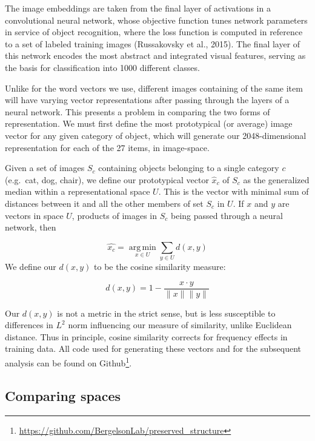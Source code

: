 \documentclass[10pt, letterpaper]{article}
\begin{document}
The image embeddings are taken from the final layer of activations in a
convolutional neural network, whose objective function tunes network
parameters in service of object recognition, where the loss function is
computed in reference to a set of labeled training images (Russakovsky
et al., 2015). The final layer of this network encodes the most abstract
and integrated visual features, serving as the basis for classification
into 1000 different classes.

Unlike for the word vectors we use, different images containing of the
same item will have varying vector representations after passing through
the layers of a neural network. This presents a problem in comparing the
two forms of representation. We must first define the most prototypical
(or average) image vector for any given category of object, which will
generate our 2048-dimensional representation for each of the 27 items,
in image-space.

Given a set of images \(S_c\) containing objects belonging to a single
category \(c\) (e.g.~cat, dog, chair), we define our prototypical vector
\(\hat{x}_c\) of \(S_c\) as the generalized median within a
representational space \(U\). This is the vector with minimal sum of
distances between it and all the other members of set \(S_c\) in \(U\).
If \(x\) and \(y\) are vectors in space \(U\), products of images in
\(S_c\) being passed through a neural network, then

\[
 \hat{x_c} = \operatorname*{arg\,min}_{x\in U} \sum_{y\in U} d(x, y)
\] We define our \(d(x, y)\) to be the cosine similarity measure:

\[
d(x, y) = 1 - \frac{x\cdot y}{\|x\|\|y\|}
\]

Our \(d(x, y)\) is not a metric in the strict sense, but is less
susceptible to differences in \(L^2\) norm influencing our measure of
similarity, unlike Euclidean distance. Thus in principle, cosine
similarity corrects for frequency effects in training data. All code
used for generating these vectors and for the subsequent analysis can be
found on
Github\footnote{\url{https://github.com/BergelsonLab/preserved_structure}}.

\subsection{Comparing spaces}\label{comparing-spaces}
\end{document}
